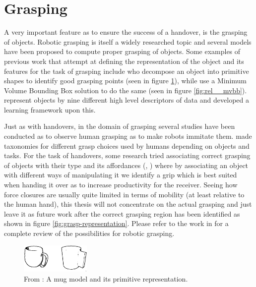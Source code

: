 \section{Grasping}
A very important feature as to ensure the success of a handover, is the grasping of objects. Robotic grasping is itself a widely researched topic and several models have been proposed to compute proper grasping of objects. Some examples of previous work that attempt at defining the representation of the object and its features for the task of grasping include \textcite{Miller2003} who decompose an object into primitive shapes to identify good grasping points (seen in figure \ref{fig:rel__shape-primitives}), while \textcite{Huebner2008} use a Minimum Volume Bounding Box solution to do the same (seen in figure \ref{fig:rel__mvbb}). \textcite{Morales} represent objects by nine different high level descriptors of data and developed a learning framework upon this.

Just as with handovers, in the domain of grasping several studies have been conducted as to observe human grasping as to make robots immitate them. \parencite{Cutkosky1990} \parencite{Feix2009} \parencite{Kang1993} made taxonomies for different grasp choices used by humans depending on objects and tasks. For the task of handovers, some research tried associating correct grasping of objects with their type and its affordances (\parencite{Song2015}, \parencite{Chan2014}) where by associating an object with different ways of manipulating it we identify a grip which is best suited when handing it over as to increase productivity for the receiver. Seeing how force closures are usually quite limited in terms of mobility (at least relative to the human hand), this thesis will not concentrate on the actual grasping and just leave it as future work after the correct grasping region has been identified as shown in figure \ref{fig:grasp-representation}. Please refer to the work in \parencite{Sahbani2012} for a complete review of the possibilities for robotic grasping.

\begin{figure}
	\centering
	\includegraphics[width=0.3\textwidth]{img/related-work/shape-primitives.png}
	\caption{From \parencite{Miller2003}: A mug model and its primitive representation.}
	\label{fig:rel__shape-primitives}
\end{figure}

